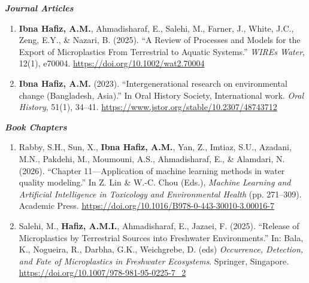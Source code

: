 \documentclass[a4paper,11pt]{article}
\begin{document}
\textbf{\textit{Journal Articles}}
\vspace{1mm}
\small{
\begin{enumerate}[leftmargin=*, labelsep=0.5em, itemsep=1.5mm]

\item \textbf{Ibna Hafiz, A.M.}, Ahmadisharaf, E., Salehi, M., Farner, J., White, J.C., Zeng, E.Y., \& Nazari, B. (2025). ``A Review of Processes and Models for the Export of Microplastics From Terrestrial to Aquatic Systems.'' \textit{WIREs Water}, 12(1), e70004. \href{https://doi.org/10.1002/wat2.70004}{https://doi.org/10.1002/wat2.70004}

\item \textbf{Ibna Hafiz, A.M.} (2023). ``Intergenerational research on environmental change (Bangladesh, Asia).'' In Oral History Society, International work. \textit{Oral History}, 51(1), 34--41. \href{https://www.jstor.org/stable/10.2307/48743712}{https://www.jstor.org/stable/10.2307/48743712}

\end{enumerate}
}
\vspace{1mm}

\textbf{\textit{Book Chapters}}
\vspace{1mm}
\small{
\begin{enumerate}[leftmargin=*, labelsep=0.5em, itemsep=1.5mm]

\item Rabby, S.H., Sun, X., \textbf{Ibna Hafiz, A.M.}, Yan, Z., Imtiaz, S.U., Azadani, M.N., Pakdehi, M., Moumouni, A.S., Ahmadisharaf, E., \& Alamdari, N. (2026). ``Chapter 11---Application of machine learning methods in water quality modeling.'' In Z. Lin \& W.-C. Chou (Eds.), \textit{Machine Learning and Artificial Intelligence in Toxicology and Environmental Health} (pp. 271--309). Academic Press. \href{https://doi.org/10.1016/B978-0-443-30010-3.00016-7}{https://doi.org/10.1016/B978-0-443-30010-3.00016-7}

\item Salehi, M., \textbf{Hafiz, A.M.I.}, Ahmadisharaf, E., Jazaei, F. (2025). ``Release of Microplastics by Terrestrial Sources into Freshwater Environments.'' In: Bala, K., Nogueira, R., Darbha, G.K., Weichgrebe, D. (eds) \textit{Occurrence, Detection, and Fate of Microplastics in Freshwater Ecosystems}. Springer, Singapore. \href{https://doi.org/10.1007/978-981-95-0225-7_2}{https://doi.org/10.1007/978-981-95-0225-7\_2}

\end{enumerate}
}
\vspace{1mm}
\end{document}

